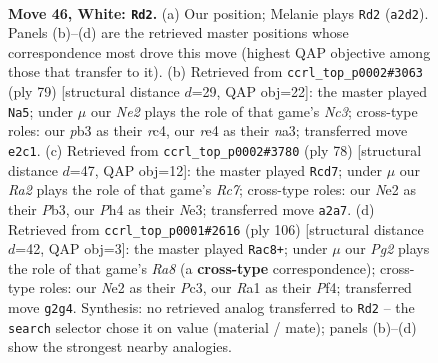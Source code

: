 \documentclass[11pt]{article}
\begin{document}
\clearpage

\begin{figure}[p]\centering
\begin{subfigure}{0.46\textwidth}\centering
\resizebox{\linewidth}{!}{%
\newchessgame
\chessboard[
  setfen={4r3/8/3p1kp1/5n1p/4r2P/1p6/R3NKP1/R7 w - - 0 46},
  showmover=false,
  pgfstyle=straightmove, color=movearrow, markmove={a2-d2}
]}
\caption{}
\end{subfigure}\hfill
\begin{subfigure}{0.46\textwidth}\centering
\resizebox{\linewidth}{!}{%
\newchessgame
\chessboard[
  setfen={8/6pk/2n4p/2r2r2/2R5/Np2R1P1/1P4KP/8 b - - 13 40},
  showmover=false,
  pgfstyle=straightmove, color=movearrow, markmove={c6-a5}
]}
\caption{}
\end{subfigure}
\\[4pt]
\begin{subfigure}{0.46\textwidth}\centering
\resizebox{\linewidth}{!}{%
\newchessgame
\chessboard[
  setfen={1r4k1/2R1Rp2/6p1/pn4Pp/5r2/1P2N3/5P1P/6K1 w - - 7 40},
  showmover=false,
  pgfstyle=straightmove, color=movearrow, markmove={c7-d7}
]}
\caption{}
\end{subfigure}\hfill
\begin{subfigure}{0.46\textwidth}\centering
\resizebox{\linewidth}{!}{%
\newchessgame
\chessboard[
  setfen={R2R4/2k5/1rp5/5p1p/1P3PpP/2P2r2/3K4/8 w - - 4 54},
  showmover=false,
  pgfstyle=straightmove, color=movearrow, markmove={a8-c8}
]}
\caption{}
\end{subfigure}
\caption{\textbf{Move 46, White: \texttt{Rd2}.} (a) Our position; Melanie plays \texttt{Rd2} (\texttt{a2d2}). Panels (b)--(d) are the retrieved master positions whose correspondence most drove this move (highest QAP objective among those that transfer to it). (b) Retrieved from \texttt{ccrl\_top\_p0002\#3063} (ply 79) [structural distance $d$=29, QAP obj=22]: the master played \texttt{Na5}; under $\mu$ our \emph{Ne2} plays the role of that game's \emph{Nc3}; cross-type roles: our \emph{p}b3 as their \emph{r}c4, our \emph{r}e4 as their \emph{n}a3; transferred move \texttt{e2c1}. (c) Retrieved from \texttt{ccrl\_top\_p0002\#3780} (ply 78) [structural distance $d$=47, QAP obj=12]: the master played \texttt{Rcd7}; under $\mu$ our \emph{Ra2} plays the role of that game's \emph{Rc7}; cross-type roles: our \emph{N}e2 as their \emph{P}b3, our \emph{P}h4 as their \emph{N}e3; transferred move \texttt{a2a7}. (d) Retrieved from \texttt{ccrl\_top\_p0001\#2616} (ply 106) [structural distance $d$=42, QAP obj=3]: the master played \texttt{Rac8+}; under $\mu$ our \emph{Pg2} plays the role of that game's \emph{Ra8} (a \textbf{cross-type} correspondence); cross-type roles: our \emph{N}e2 as their \emph{P}c3, our \emph{R}a1 as their \emph{P}f4; transferred move \texttt{g2g4}. Synthesis: no retrieved analog transferred to \texttt{Rd2} -- the \texttt{search} selector chose it on value (material / mate); panels (b)--(d) show the strongest nearby analogies.}
\label{fig:thought-m90}
\end{figure}
\end{document}
